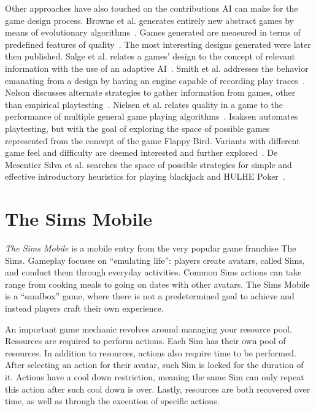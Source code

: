 \documentclass[letterpaper]{article} %
\begin{document}
Other approaches have also touched on the contributions AI can make for the game design process. Browne et al. generates entirely new abstract games by means of evolutionary algorithms~\cite{browne2010evolutionary}. Games generated are measured in terms of predefined features of quality~\cite{browne2008automatic}. The most interesting designs generated were later then published. Salge et al. relates a games' design to the concept of relevant information with the use of an adaptive AI~\cite{[7]salge2010relevant}. Smith et al. addresses the behavior emanating from a design by having an engine capable of recording play traces~\cite{smith2010ludocore}. Nelson discusses alternate strategies to gather information from games, other than empirical playtesting~\cite{Metrics:IDP11}. Nielsen et al. relates quality in a game to the performance of multiple general game playing algorithms~\cite{nielsen2015general}. Isaksen automates playtesting, but with the goal of exploring the space of possible games represented from the concept of the game Flappy Bird. Variants with different game feel and difficulty are deemed interested and further explored~\cite{isaksen2015discovering,isaksen2015exploring}. De Mesentier Silva et al. searches the space of possible strategies for simple and effective introductory heuristics for playing blackjack and HULHE Poker~\cite{degenerating,de2018preflop,de2018post-flop}.


\section{The Sims Mobile}


{\em The Sims Mobile} is a mobile entry from the very popular game franchise The Sims. Gameplay focuses on ``emulating life'': players create avatars, called Sims, and conduct them through everyday activities. Common Sims actions can take range from cooking meals to going on dates with other avatars. The Sims Mobile is a ``sandbox'' game, where there is not a predetermined goal to achieve and instead players craft their own experience.


An important game mechanic revolves around managing your resource pool. Resources are required to perform actions. Each Sim has their own pool of resources. In addition to resources, actions also require time to be performed. After selecting an action for their avatar, such Sim is locked for the duration of it. Actions have a cool down restriction, meaning the same Sim can only repeat this action after such cool down is over. Lastly, resources are both recovered over time, as well as through the execution of specific actions.
\end{document}
